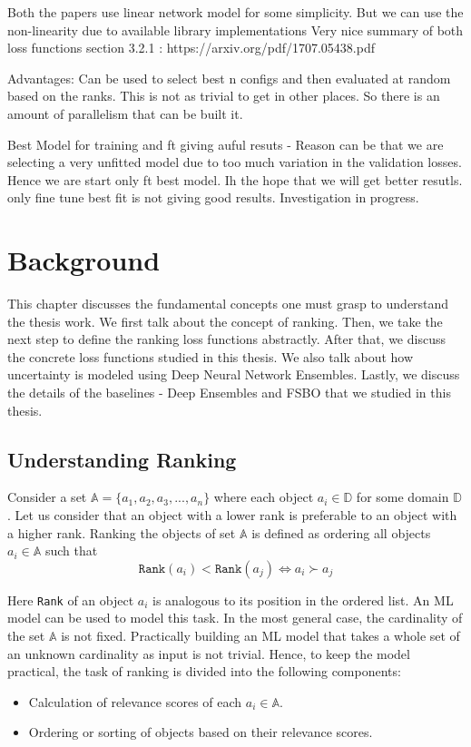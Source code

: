 \documentclass[12pt, twoside, ngerman]{report}
\begin{document}
    Both the papers use linear network model for some simplicity. But we can use the non-linearity due to available library
        implementations
    Very nice summary of both loss functions section 3.2.1 : https://arxiv.org/pdf/1707.05438.pdf 

Advantages:
    Can be used to select best n configs and then evaluated at random based on the ranks. This is not as trivial to get in other
    places. So there is an amount of parallelism that can be built it.

Best Model for training and ft giving auful resuts - Reason can be that we are selecting a very unfitted model due to too much variation in the validation losses.
Hence we are start only ft best model. Ih the hope that we will get better resutls.
only fine tune best fit is not giving good results. Investigation in progress. 

\fi


\chapter{Background}
\label{chap:Background}

This chapter discusses the fundamental concepts one must grasp to understand the thesis work. 
We first talk about the concept of ranking.
Then, we take the next step to define the ranking loss functions abstractly.
After that, we discuss the concrete loss functions studied in this thesis.
We also talk about how uncertainty is modeled using Deep Neural Network Ensembles.
Lastly,  we discuss the details of the baselines - Deep Ensembles and FSBO that we studied in this thesis.

\section{Understanding Ranking}

Consider a set $\mathbb{A} = \{a_1,  a_2,  a_3, ... ,  a_n\}$ where each object $a_i \in \mathbb{D}$ for some domain $\mathbb{D}$.
Let us consider that an object with a lower rank is preferable to an object with a higher rank.
Ranking the objects of set $\mathbb{A}$ is defined as ordering all objects $a_i \in \mathbb{A}$ such that
$$
\texttt{Rank}(a_i) < \texttt{Rank}(a_j) \iff a_i  \succ a_j
$$

Here \texttt{Rank} of an object $a_i$ is analogous to its position in the ordered list.
An ML model can be used to model this task.
In the most general case, the cardinality of the set $\mathbb{A}$ is not fixed.
Practically building an ML model that takes a whole set of an unknown cardinality as input is not trivial.
Hence, to keep the model practical, the task of ranking is divided into the following components:~\cite{procedureforrankinginintro}
\begin{itemize}
\item Calculation of relevance scores of each $a_i \in \mathbb{A}$.
\item Ordering or sorting of objects based on their relevance scores. 
\end{itemize}
\end{document}
